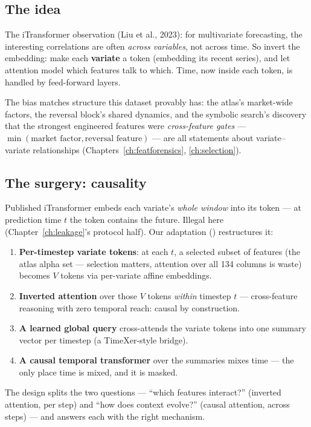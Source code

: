 \subsection{The idea}

The iTransformer observation (Liu et al., 2023): for multivariate
forecasting, the interesting correlations are often \emph{across
variables}, not across time. So invert the embedding: make each
\textbf{variate} a token (embedding its recent series), and let attention
model which features talk to which. Time, now inside each token, is
handled by feed-forward layers.

The bias matches structure this dataset provably has: the atlas's
market-wide factors, the reversal block's shared dynamics, and the
symbolic search's discovery that the strongest engineered features were
\emph{cross-feature gates} --- $\min(\text{market factor},
\text{reversal feature})$ --- are all statements about variate--variate
relationships (Chapters~\ref{ch:featforensics}, \ref{ch:selection}).

\subsection{The surgery: causality}

Published iTransformer embeds each variate's \emph{whole window} into its
token --- at prediction time $t$ the token contains the future.
Illegal here (Chapter~\ref{ch:leakage}'s protocol half). Our adaptation
() restructures it:

\begin{enumerate}
\item \textbf{Per-timestep variate tokens}: at each $t$, a selected subset
  of features (the atlas alpha set --- selection matters, attention over
  all 134 columns is waste) becomes $V$ tokens via per-variate affine
  embeddings.
\item \textbf{Inverted attention} over those $V$ tokens \emph{within}
  timestep $t$ --- cross-feature reasoning with zero temporal reach:
  causal by construction.
\item \textbf{A learned global query} cross-attends the variate tokens
  into one summary vector per timestep (a TimeXer-style bridge).
\item \textbf{A causal temporal transformer} over the summaries mixes time
  --- the only place time is mixed, and it is masked.
\end{enumerate}

The design splits the two questions --- ``which features interact?''
(inverted attention, per step) and ``how does context evolve?'' (causal
attention, across steps) --- and answers each with the right mechanism.

